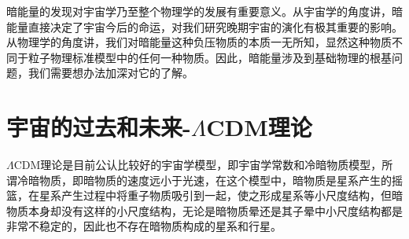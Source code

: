 \documentclass[UTF8]{ctexart}
\begin{document}
暗能量的发现对宇宙学乃至整个物理学的发展有重要意义。从宇宙学的角度讲，暗能量直接决定了宇宙今后的命运，对我们研究晚期宇宙的演化有极其重要的影响。从物理学的角度讲，我们对暗能量这种负压物质的本质一无所知，显然这种物质不同于粒子物理标准模型中的任何一种物质。因此，暗能量涉及到基础物理的根基问题，我们需要想办法加深对它的了解。
\section{宇宙的过去和未来-$\Lambda $CDM理论}
$\Lambda $CDM理论是目前公认比较好的宇宙学模型，即宇宙学常数和冷暗物质模型，所谓冷暗物质，即暗物质的速度远小于光速，在这个模型中，暗物质是星系产生的摇篮，在星系产生过程中将重子物质吸引到一起，使之形成星系等小尺度结构，但暗物质本身却没有这样的小尺度结构，无论是暗物质晕还是其子晕中小尺度结构都是非常不稳定的，因此也不存在暗物质构成的星系和行星。
\end{document}
